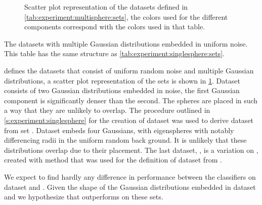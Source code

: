 
\begin{figure}
	\centering
	
	\caption{Scatter plot representation of the datasets defined in \cref{tab:experiment:multisphere:sets}, the colors used for the different components correspond with the colors used in that table.}
	\label{fig:experiment:multisphere:sets}
\end{figure}

\begin{table*}
	\centering
	
	\caption{The datasets with multiple Gaussian distributions embedded in uniform noise. This table has the same structure as \cref{tab:experiment:singlesphere:sets}.} 	
	\label{tab:experiment:multisphere:sets}
\end{table*}

 defines the datasets that consist of uniform random noise and multiple Gaussian distributions, a scatter plot representation of the sets is shown in \cref{fig:experiment:multisphere:sets}. 
	Dataset \ferdosiTwo consists of two Gaussian distributions embedded in noise, the first Gaussian component is significantly denser than the second. The spheres are placed in such a way that they are unlikely to overlap. 
	The procedure outlined in \cref{s:experiment:singlesphere} for the creation of dataset \baakmanOne was used to derive dataset \baakmanTwo from set \ferdosiTwo.
	Dataset \ferdosiThree embeds four Gaussians, with eigenspheres with notably differencing radii in the uniform random back ground. It is unlikely that these distributions overlap due to their placement. 
	The last dataset, \baakmanThree, is a variation on \ferdosiThree, created with method that was used for the definition of dataset \baakmanTwo from \baakmanOne. 

	We expect to find hardly any difference in performance between the classifiers on dataset \ferdosiTwo and \ferdosiThree. Given the shape of the Gaussian distributions embedded in dataset \baakmanTwo and \baakmanThree we hypothesize that \sambe outperforms \mbe on these sets.